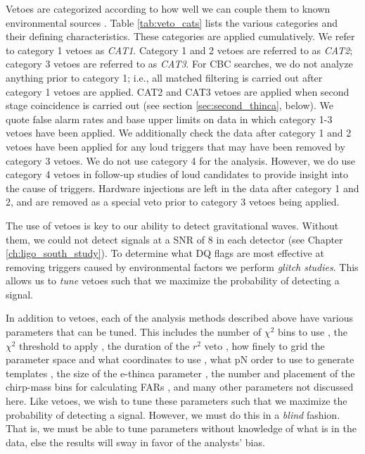 Vetoes are categorized according to how well we can couple them to known
environmental sources \cite{Slutsky:2010ff, Christensen:2010}. Table
\ref{tab:veto_cats} lists the various categories and their defining
characteristics. These categories are applied cumulatively. We refer to
category 1 vetoes as \emph{CAT1}. Category 1 and 2 vetoes are referred to as
\emph{CAT2}; category 3 vetoes are referred to as \emph{CAT3}. For \ac{CBC}
searches, we do not analyze anything prior to category 1; i.e., all matched
filtering is carried out after category 1 vetoes are applied. CAT2 and CAT3
vetoes are applied when second stage coincidence is carried out (see section
\ref{sec:second_thinca}, below). We quote false alarm rates and base upper
limits on data in which category 1-3 vetoes have been applied. We additionally
check the data after category 1 and 2 vetoes have been applied for any loud
triggers that may have been removed by category 3 vetoes. We do not use
category 4 for the analysis.  However, we do use category 4 vetoes in follow-up
studies of loud candidates to provide insight into the cause of triggers.
Hardware injections are left in the data after category 1 and 2, and are
removed as a special veto prior to category 3 vetoes being applied.

The use of vetoes is key to our ability to detect gravitational waves. Without
them, we could not detect signals at a \ac{SNR} of $8$ in each detector (see
Chapter \ref{ch:ligo_south_study}). To determine what \ac{DQ} flags are most
effective at removing triggers caused by environmental factors we perform
\emph{glitch studies}. This allows us to \emph{tune} vetoes such that we
maximize the probability of detecting a signal.

In addition to vetoes, each of the analysis methods described above have
various parameters that can be tuned. This includes the number of $\chi^2$ bins
to use \cite{Brown}, the $\chi^2$ threshold to apply \cite{Keppel:thesis}, the
duration of the $r^2$ veto \cite{Rodriguez:2007}, how finely to grid the
parameter space and what coordinates to use \cite{Owen:1998dk, Tanaka:2000,
BBCCS:2006, hexabank}, what \ac{pN} order to use to generate templates
\cite{Collaboration:2009tt, Abbott:2009qj, Collaboration:S6CBClowmass}, the
size of the e-thinca parameter \cite{Robinson:2008, Keppel:thesis}, the number
and placement of the chirp-mass bins for calculating \acp{FAR}
\cite{Keppel:thesis}, and many other parameters not discussed here. Like vetoes,
we wish to tune these parameters such that we maximize the probability of
detecting a signal. However, we must do this in a {\it blind} fashion. That is,
we must be able to tune parameters without knowledge of what is in the data,
else the results will sway in favor of the analysts' bias.

